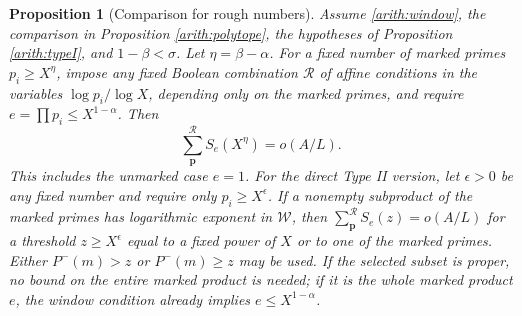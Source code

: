 \documentclass[11pt,a4paper]{article}
\theoremstyle{paperplain}
\newtheorem{proposition}[theorem]{Proposition}
\numberwithin{equation}{section}
\begin{document}
\begin{proposition}[Comparison for rough numbers]\label{arith:rough}
Assume \eqref{arith:window}, the comparison in Proposition
\ref{arith:polytope}, the hypotheses of Proposition \ref{arith:typeI},
and $1-\beta<\sigma$. Let $\eta=\beta-\alpha$.
For a fixed number of marked primes $p_i\ge X^\eta$, impose any
fixed Boolean combination $\mathcal R$ of affine conditions in
the variables $\log p_i/\log X$, depending only on the marked primes,
and require
$e=\prod p_i\le X^{1-\alpha}$. Then
\begin{equation}\label{arith:roughformula}
 \sum_{\boldsymbol p}^{\mathcal R}S_e(X^\eta)=o(A/L).
\end{equation}
This includes the unmarked case $e=1$.
For the direct Type II version, let $\epsilon>0$ be any fixed
number and require only $p_i\ge X^\epsilon$.
If a nonempty subproduct of the marked primes has logarithmic
exponent in $\mathcal W$, then
$\sum_{\boldsymbol p}^{\mathcal R}S_e(z)=o(A/L)$ for a threshold
$z\ge X^\epsilon$ equal to a fixed power of $X$ or to one of the
marked primes. Either $P^-(m)>z$ or $P^-(m)\ge z$ may be used.
If the selected subset is proper, no bound on the entire marked product
is needed; if it is the whole marked product $e$, the window condition
already implies $e\le X^{1-\alpha}$.
\end{proposition}
\end{document}
